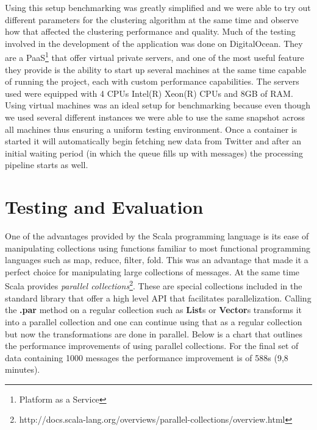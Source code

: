 \newline
Using this setup benchmarking was greatly simplified and we were able to try out different parameters for the clustering algorithm at the same time and observe how that affected the clustering performance and quality.
Much of the testing involved in the development of the application was done on DigitalOcean. They are a PaaS\footnote{Platform as a Service} that offer virtual private servers, and one of the most useful feature they provide is the ability to start up several machines at the same time capable of running the project, each with custom performance capabilities. The servers used were equipped with 4 CPUs Intel(R) Xeon(R) CPUs and 8GB of RAM. Using virtual machines was an ideal setup for benchmarking because even though we used several different instances we were able to use the same snapshot across all machines thus ensuring a uniform testing environment. Once a container is started it will automatically begin fetching new data from Twitter and after an initial waiting period (in which the queue fills up with messages) the processing pipeline starts as well.
\newline

\section{Testing and Evaluation}
\label{sec:testing}

One of the advantages provided by the Scala programming language is its ease of manipulating collections using functions familiar to most functional programming languages such as map, reduce, filter, fold. This was an advantage that made it a perfect choice for manipulating large collections of messages.
At the same time Scala provides \textit{parallel collections}\footnote{http://docs.scala-lang.org/overviews/parallel-collections/overview.html}. These are special collections included in the standard library that offer a high level API that facilitates parallelization. Calling the \textbf{.par} method on a regular collection such as \textbf{List}s or \textbf{Vector}s transforms it into a parallel collection and one can continue using that as a regular collection but now the transformations are done in parallel.
\newline
Below is a chart that outlines the performance improvements of using parallel collections. For the final set of data containing 1000 messages the performance improvement is of 588s (9,8 minutes). 

